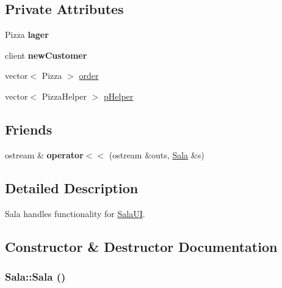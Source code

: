 \subsection*{Private Attributes}
\begin{CompactItemize}
\item 
\hypertarget{class_sala_0f90fe5c344e62852b747ecbdc5b5d90}{
Pizza {\bf lager}}
\label{class_sala_0f90fe5c344e62852b747ecbdc5b5d90}

\item 
\hypertarget{class_sala_d6980eaf5555befe23d2271575d6d9cb}{
client {\bf new\-Customer}}
\label{class_sala_d6980eaf5555befe23d2271575d6d9cb}

\item 
vector$<$ Pizza $>$ \hyperlink{class_sala_70a17ffa722a3985b86d30b034ad06d7}{order}
\item 
vector$<$ Pizza\-Helper $>$ \hyperlink{class_sala_4b1abb1f80ebc80a2334733ae62acde2}{p\-Helper}
\end{CompactItemize}
\subsection*{Friends}
\begin{CompactItemize}
\item 
\hypertarget{class_sala_b32b27b19243c1cf7bcfffe604ea1736}{
ostream \& {\bf operator$<$$<$} (ostream \&outs, \hyperlink{class_sala}{Sala} \&s)}
\label{class_sala_b32b27b19243c1cf7bcfffe604ea1736}

\end{CompactItemize}


\subsection{Detailed Description}
Sala handles functionality for \hyperlink{class_sala_u_i}{Sala\-UI}. 



\subsection{Constructor \& Destructor Documentation}
\hypertarget{class_sala_da283dd136f3f0c2703d0356f49c1e6e}{
\subsubsection[Sala]{\setlength{\rightskip}{0pt plus 5cm}Sala::Sala ()}}
\label{class_sala_da283dd136f3f0c2703d0356f49c1e6e}


